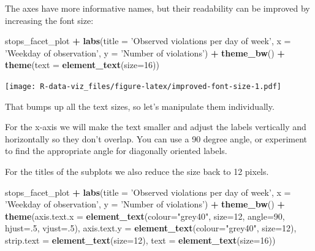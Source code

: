 \documentclass[]{book}
\newenvironment{Shaded}{\begin{snugshade}}{\end{snugshade}}
\newcommand{\KeywordTok}[1]{\textcolor[rgb]{0.13,0.29,0.53}{\textbf{#1}}}
\newcommand{\DataTypeTok}[1]{\textcolor[rgb]{0.13,0.29,0.53}{#1}}
\newcommand{\DecValTok}[1]{\textcolor[rgb]{0.00,0.00,0.81}{#1}}
\newcommand{\StringTok}[1]{\textcolor[rgb]{0.31,0.60,0.02}{#1}}
\newcommand{\OperatorTok}[1]{\textcolor[rgb]{0.81,0.36,0.00}{\textbf{#1}}}
\newcommand{\NormalTok}[1]{#1}
\theoremstyle{definition}
\theoremstyle{definition}
\theoremstyle{definition}
\theoremstyle{remark}
\begin{document}
The axes have more informative names, but their readability can be
improved by increasing the font size:

\begin{Shaded}
\begin{Highlighting}[]
\NormalTok{stops_facet_plot }\OperatorTok{+}
\StringTok{  }\KeywordTok{labs}\NormalTok{(}\DataTypeTok{title =} \StringTok{'Observed violations per day of week'}\NormalTok{,}
         \DataTypeTok{x =} \StringTok{'Weekday of observation'}\NormalTok{,}
         \DataTypeTok{y =} \StringTok{'Number of violations'}\NormalTok{) }\OperatorTok{+}
\StringTok{  }\KeywordTok{theme_bw}\NormalTok{() }\OperatorTok{+}\StringTok{ }
\StringTok{  }\KeywordTok{theme}\NormalTok{(}\DataTypeTok{text =} \KeywordTok{element_text}\NormalTok{(}\DataTypeTok{size=}\DecValTok{16}\NormalTok{))}
\end{Highlighting}
\end{Shaded}

\texttt{[image: R-data-viz\_files/figure-latex/improved-font-size-1.pdf]}

That bumps up all the text sizes, so let's manipulate them individually.

For the x-axis we will make the text smaller and adjust the labels
vertically and horizontally so they don't overlap. You can use a 90
degree angle, or experiment to find the appropriate angle for diagonally
oriented labels.

For the titles of the subplots we also reduce the size back to 12
pixels.

\begin{Shaded}
\begin{Highlighting}[]
\NormalTok{stops_facet_plot }\OperatorTok{+}
\StringTok{  }\KeywordTok{labs}\NormalTok{(}\DataTypeTok{title =} \StringTok{'Observed violations per day of week'}\NormalTok{,}
         \DataTypeTok{x =} \StringTok{'Weekday of observation'}\NormalTok{,}
         \DataTypeTok{y =} \StringTok{'Number of violations'}\NormalTok{) }\OperatorTok{+}
\StringTok{  }\KeywordTok{theme_bw}\NormalTok{() }\OperatorTok{+}\StringTok{ }
\StringTok{  }\KeywordTok{theme}\NormalTok{(}\DataTypeTok{axis.text.x =} \KeywordTok{element_text}\NormalTok{(}\DataTypeTok{colour=}\StringTok{"grey40"}\NormalTok{, }\DataTypeTok{size=}\DecValTok{12}\NormalTok{, }\DataTypeTok{angle=}\DecValTok{90}\NormalTok{, }\DataTypeTok{hjust=}\NormalTok{.}\DecValTok{5}\NormalTok{, }\DataTypeTok{vjust=}\NormalTok{.}\DecValTok{5}\NormalTok{),}
        \DataTypeTok{axis.text.y =} \KeywordTok{element_text}\NormalTok{(}\DataTypeTok{colour=}\StringTok{"grey40"}\NormalTok{, }\DataTypeTok{size=}\DecValTok{12}\NormalTok{),}
        \DataTypeTok{strip.text =} \KeywordTok{element_text}\NormalTok{(}\DataTypeTok{size=}\DecValTok{12}\NormalTok{),}
        \DataTypeTok{text =} \KeywordTok{element_text}\NormalTok{(}\DataTypeTok{size=}\DecValTok{16}\NormalTok{))}
\end{Highlighting}
\end{Shaded}
\end{document}
